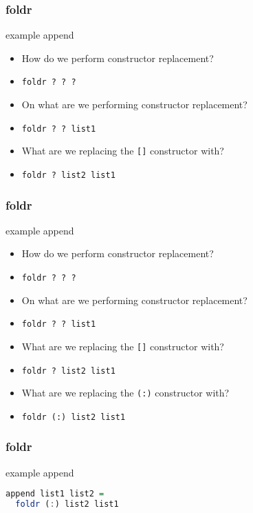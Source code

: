 \begin{frame}
\frametitle{foldr}

\begin{block}{example \textemdash append}

\begin{itemize}
\item How do we perform constructor replacement?
\item \lstinline[basicstyle=\ttfamily]$foldr ? ? ?$
\item On what are we performing constructor replacement?
\item \lstinline[basicstyle=\ttfamily]$foldr ? ? list1$
\item What are we replacing the \lstinline[basicstyle=\ttfamily]$[]$ constructor with?
\item \lstinline[basicstyle=\ttfamily]$foldr ? list2 list1$
\end{itemize}

\end{block}

\end{frame}


\begin{frame}
\frametitle{foldr}

\begin{block}{example \textemdash append}

\begin{itemize}
\item How do we perform constructor replacement?
\item \lstinline[basicstyle=\ttfamily]$foldr ? ? ?$
\item On what are we performing constructor replacement?
\item \lstinline[basicstyle=\ttfamily]$foldr ? ? list1$
\item What are we replacing the \lstinline[basicstyle=\ttfamily]$[]$ constructor with?
\item \lstinline[basicstyle=\ttfamily]$foldr ? list2 list1$
\item What are we replacing the \lstinline[basicstyle=\ttfamily]$(:)$ constructor with?
\item \lstinline[basicstyle=\ttfamily]$foldr (:) list2 list1$
\end{itemize}

\end{block}

\end{frame}


\begin{frame}[fragile]
\frametitle{foldr}

\begin{block}{example \textemdash append}

\begin{lstlisting}[language=haskell]
append list1 list2 =
  foldr (:) list2 list1
\end{lstlisting}

\end{block}

\end{frame}


